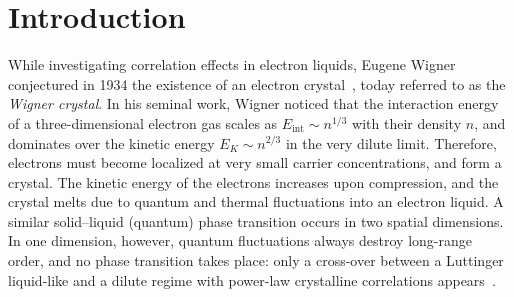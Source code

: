 \documentclass[aps, prb, floatfix, twocolumn, notitlepage, superscriptaddress, 10pt]{revtex4-2}
\newcommand{\1}{{1\hspace*{-0.5ex} \textrm{l} \hspace*{0.5ex}}}
\begin{document}
\section{Introduction}


While investigating correlation effects in electron liquids, Eugene Wigner conjectured in 1934 the existence of an electron crystal~\cite{Wigner1934}, today referred to as the \emph{Wigner crystal}. In his seminal work, 
Wigner noticed that  the interaction energy of a three-dimensional electron gas  
scales as $E_{\text{int}}\sim n^{1/3}$ with their density $n$, and dominates over the kinetic energy $E_K\sim n^{2/3}$
in the very dilute limit. 
Therefore,  electrons must become localized at very small carrier concentrations, and form a crystal. 
The kinetic energy of the electrons increases upon compression,  and the crystal  melts due to quantum 
and thermal fluctuations into an electron liquid. 
A similar solid–liquid (quantum) phase transition occurs in two spatial dimensions. In one dimension, however, 
quantum fluctuations always destroy long-range order, and no phase transition takes place: 
only a cross-over  between a Luttinger liquid-like  and a dilute regime with power-law crystalline correlations
appears~\cite{Schulz1993}.  
\end{document}
